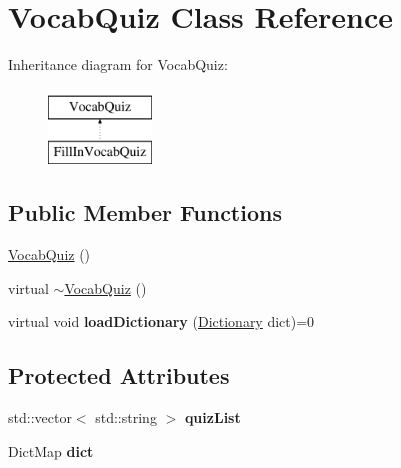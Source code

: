 \hypertarget{classVocabQuiz}{
\section{VocabQuiz Class Reference}
\label{classVocabQuiz}
}
Inheritance diagram for VocabQuiz:\begin{figure}[H]
\begin{center}
\leavevmode
\includegraphics[height=2cm]{classVocabQuiz}
\end{center}
\end{figure}
\subsection*{Public Member Functions}
\begin{DoxyCompactItemize}
\item 
\hyperlink{classVocabQuiz_aa9f188fd46b6bfd21c8e1e3d5883d350}{VocabQuiz} ()
\item 
virtual \hyperlink{classVocabQuiz_a55c4c64161cc8e22643b0daa8dcf95a4}{$\sim$VocabQuiz} ()
\item 
\hypertarget{classVocabQuiz_af224c714b231d7ff4a8de770ce7280e3}{
virtual void {\bfseries loadDictionary} (\hyperlink{classDictionary}{Dictionary} dict)=0}
\label{classVocabQuiz_af224c714b231d7ff4a8de770ce7280e3}

\end{DoxyCompactItemize}
\subsection*{Protected Attributes}
\begin{DoxyCompactItemize}
\item 
\hypertarget{classVocabQuiz_a3d250f48f417926d00a41e6bdbf3d47f}{
std::vector$<$ std::string $>$ {\bfseries quizList}}
\label{classVocabQuiz_a3d250f48f417926d00a41e6bdbf3d47f}

\item 
\hypertarget{classVocabQuiz_af9090d47e0a1e8b3b40c39f55afd60a1}{
DictMap {\bfseries dict}}
\label{classVocabQuiz_af9090d47e0a1e8b3b40c39f55afd60a1}

\end{DoxyCompactItemize}


